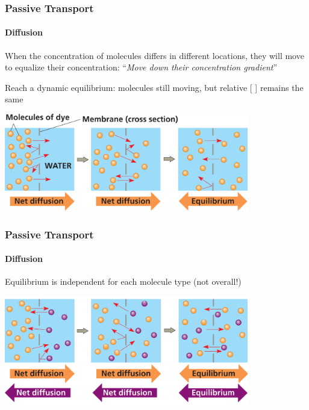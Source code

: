 \documentclass[10pt]{beamer}
\begin{document}
\begin{frame}[t]
\frametitle{Passive Transport}
\framesubtitle{Diffusion}
\vspace{0.5cm}

	When the concentration of molecules differs in different locations, they will move to equalize their concentration: ``\emph{Move down their concentration gradient}''\\

	\vspace{0.5cm}
	
	Reach a \textcolor{myblue}{dynamic equilibrium}: molecules still moving, but relative [ ] remains the same	
	
	\vspace{0.5cm}
	
	\begin{center}
		\includegraphics[width=0.8\textwidth]{figures/fg07_10a.jpg}
	\end{center}
\end{frame}


\begin{frame}[t]
\frametitle{Passive Transport}
\framesubtitle{Diffusion}
\vspace{0.5cm}

	Equilibrium is independent for each molecule type (not overall!)
	
	\vspace{0.5cm}
	
	\begin{center}
		\includegraphics[width=0.8\textwidth]{figures/fg07_10b.jpg}
	\end{center}
\end{frame}
\end{document}
